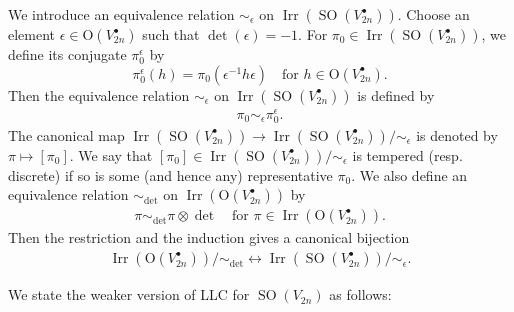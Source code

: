\documentclass[article]{article}
\numberwithin{equation}{section}
\theoremstyle{definition}
\DeclareMathOperator{\SO}{SO}
\DeclareMathOperator{\Irr}{Irr}
\begin{document}
We introduce an equivalence relation $\sim_{\epsilon}$ on $\Irr(\SO (V_{2n}^\bullet))$. Choose an element $\epsilon\in \mathrm O(V_{2n}^\bullet)$ such that $\det(\epsilon)=-1$. For $\pi_0\in \Irr(\SO (V_{2n}^\bullet))$, we define its conjugate $\pi_0^\epsilon$ by $$\pi_0^\epsilon(h)=\pi_0(\epsilon^{-1}h\epsilon) \quad \mbox{for $h\in \mathrm O(V_{2n}^\bullet)$}.$$ 
Then the equivalence relation $\sim_{\epsilon}$ on $\Irr(\SO (V_{2n}^\bullet))$ is defined by 
\begin{align*}
\pi_0 \sim_{\epsilon} \pi_0^\epsilon.
\end{align*}
The canonical map $\Irr(\SO (V_{2n}^\bullet))\rightarrow \Irr(\SO (V_{2n}^\bullet))/\sim_{\epsilon}$ is denoted by $\pi\mapsto [\pi_0]$. We say that $[\pi_0]\in \Irr(\SO (V_{2n}^\bullet))/\sim_{\epsilon}$ is tempered (resp. discrete) if so is some (and hence any) representative $\pi_0$. We also define an equivalence relation $\sim_{\det}$ on $\Irr(\mathrm  O(V_{2n}^\bullet))$ by 
\begin{align*}
\pi\sim_{\det} \pi\otimes\det \quad \mbox{for $\pi\in \Irr(\mathrm O(V_{2n}^\bullet))$}.
\end{align*}
Then the restriction and the induction gives a canonical bijection 
\begin{align*}
\Irr(\mathrm O(V_{2n}^\bullet))/\sim_{\det} \longleftrightarrow \Irr(\SO  (V_{2n}^\bullet))/\sim_{\epsilon}. 
\end{align*}
\begin{comment}
On the other hand, we introduce an equivalence relation $\sim_{\epsilon}$ on $\Phi(\SO(V_{2n}))$. For $\phi,\phi^\prime\in \Phi(\SO(V_{2n}))$, we write $\phi\sim_{\epsilon}\phi^\prime$ if $\phi$ is $\mathrm O(2n,\mathbb C)$-conjugate to $\phi^\prime$. The equivalence class of $\phi$ is also denoted by $\phi$.
\end{comment}
We state the weaker version of LLC for $\SO(V_{2n})$ as follows: 
\end{document}
